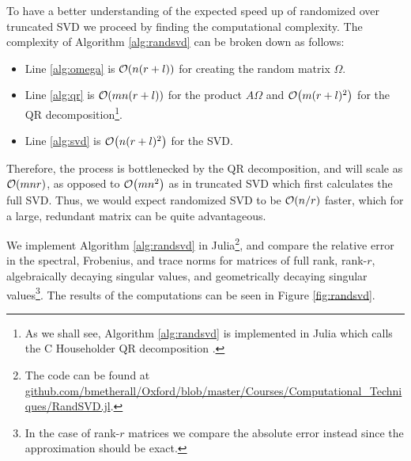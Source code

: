 \documentclass[11pt, a4paper, twocolumn]{article}
\let\originalleft\left
\let\originalright\right
\renewcommand{\left}{\mathopen{}\mathclose\bgroup\originalleft}
\renewcommand{\right}{\aftergroup\egroup\originalright}
\providecommand{\bigO}[1]{\ensuremath{\mathop{}\mathopen{}\mathcal{O}\mathopen{}\left(#1\right)}}
\begin{document}
To have a better understanding of the expected speed up of randomized over truncated SVD we proceed by finding the computational complexity. The complexity of Algorithm \ref{alg:randsvd} can be broken down as follows:
\begin{itemize}
    \item Line \ref{alg:omega} is $\bigO{n(r + l)}$ for creating the random matrix $\Omega$.
    \item Line \ref{alg:qr} is $\bigO{mn(r + l)}$ for the product $A \Omega$ and $\bigO{m(r + l)^2}$ for the QR decomposition\footnote{As we shall see, Algorithm \ref{alg:randsvd} is implemented in Julia which calls the C Householder QR decomposition \cite{juliala}.}.
    \item Line \ref{alg:svd} is $\bigO{n(r + l)^2}$ for the SVD.
\end{itemize}
Therefore, the process is bottlenecked by the QR decomposition, and will scale as $\bigO{mnr}$, as opposed to $\bigO{mn^2}$ as in truncated SVD which first calculates the full SVD. Thus, we would expect randomized SVD to be $\bigO{n / r}$ faster, which for a large, redundant matrix can be quite advantageous.

We implement Algorithm \ref{alg:randsvd} in Julia\footnote{The code can be found at \url{github.com/bmetherall/Oxford/blob/master/Courses/Computational_Techniques/RandSVD.jl}.}, and compare the relative error in the spectral, Frobenius, and trace norms for matrices of full rank, rank-$r$, algebraically decaying singular values, and geometrically decaying singular values\footnote{In the case of rank-$r$ matrices we compare the absolute error instead since the approximation should be exact.}. The results of the computations can be seen in Figure \ref{fig:randsvd}.
\end{document}
